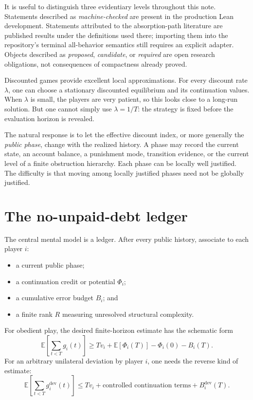 \documentclass[11pt]{article}
\newcommand{\E}{\mathbb{E}}
\begin{document}
It is useful to distinguish three evidentiary levels throughout this note.
Statements described as \emph{machine-checked} are present in the production
Lean development.  Statements attributed to the absorption-path literature
are published results under the definitions used there; importing them into
the repository's terminal all-behavior semantics still requires an explicit
adapter.  Objects described as \emph{proposed}, \emph{candidate}, or
\emph{required} are open research obligations, not consequences of
compactness already proved.

Discounted games provide excellent local approximations.  For every discount
rate \(\lambda\), one can choose a stationary discounted equilibrium and its
continuation values.  When \(\lambda\) is small, the players are very patient,
so this looks close to a long-run solution.  But one cannot simply use
\(\lambda=1/T\): the strategy is fixed before the evaluation horizon is
revealed.

The natural response is to let the effective discount index, or more
generally the \emph{public phase}, change with the realized history.  A phase
may record the current state, an account balance, a punishment mode,
transition evidence, or the current level of a finite obstruction
hierarchy.  Each phase can be locally well justified.  The difficulty is
that moving among locally justified phases need not be globally justified.

\section{The no-unpaid-debt ledger}

The central mental model is a ledger.  After every public history, associate
to each player \(i\):
\begin{itemize}
  \item a current public phase;
  \item a continuation credit or potential \(\Phi_i\);
  \item a cumulative error budget \(B_i\); and
  \item a finite rank \(R\) measuring unresolved structural complexity.
\end{itemize}

For obedient play, the desired finite-horizon estimate has the schematic
form
\begin{equation}
  \E\!\left[\sum_{t<T} g_i(t)\right]
  \geq
  T v_i+
 \E[\Phi_i(T)]-\Phi_i(0)-B_i(T).
  \label{eq:lower-ledger}
\end{equation}
For an arbitrary unilateral deviation by player \(i\), one needs the reverse
kind of estimate:
\begin{equation}
  \E\!\left[\sum_{t<T} g_i^{\mathrm{dev}}(t)\right]
  \leq
  T v_i+
 \text{controlled continuation terms}
  +B_i^{\mathrm{dev}}(T).
  \label{eq:upper-ledger}
\end{equation}
\end{document}
